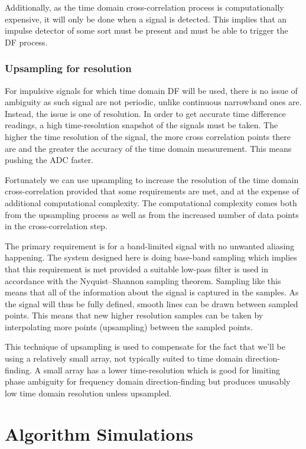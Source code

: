 Additionally, as the time domain cross-correlation process is computationally expensive, it will only be done when a signal is detected. This implies that an impulse detector of some sort must be present and must be able to trigger the DF process.

\subsubsection{Upsampling for resolution}
For impulsive signals for which time domain DF will be used, there is no issue of ambiguity as such signal are not periodic, unlike continuous narrowband ones are. Instead, the issue is one of resolution. In order to get accurate time difference readings, a high time-resolution snapshot of the signals must be taken. The higher the time resolution of the signal, the more cross correlation points there are and the greater the accuracy of the time domain measurement. This means pushing the ADC faster.

Fortunately we can use upsampling to increase the resolution of the time domain cross-correlation provided that some requirements are met, and at the expense of additional computational complexity. The computational complexity comes both from the upsampling process as well as from the increased number of data points in the cross-correlation step.

The primary requirement is for a band-limited signal with no unwanted aliasing happening. The system designed here is doing base-band sampling which implies that this requirement is met provided a suitable low-pass filter is used in accordance with the Nyquist–Shannon sampling theorem. Sampling like this means that all of the information about the signal is captured in the samples. As the signal will thus be fully defined, smooth lines can be drawn between sampled points. This means that new higher resolution samples can be taken by interpolating more points (upsampling) between the sampled points.

This technique of upsampling is used to compensate for the fact that we'll be using a relatively small array, not typically suited to time domain direction-finding. A small array has a lower time-resolution which is good for limiting phase ambiguity for frequency domain direction-finding but produces unusably low time domain resolution unless upsampled.

\section{Algorithm Simulations}
